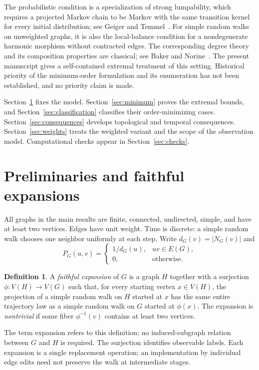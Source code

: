 \documentclass[11pt]{article}
\theoremstyle{definition}
\newtheorem{definition}[theorem]{Definition}
\numberwithin{equation}{section}
\newcommand{\V}{V}
\newcommand{\E}{E}
\newcommand{\N}{N}
\begin{document}
The probabilistic condition is a specialization of strong lumpability,
which requires a projected Markov chain to be Markov with the same transition
kernel for every initial distribution; see Geiger and Temmel~\cite{GT}.
For simple random walks on unweighted graphs, it is also the local-balance
condition for a nondegenerate harmonic morphism without contracted edges.
The corresponding degree theory and its composition properties are
classical; see Baker and Norine~\cite{BN}. The present manuscript gives a
self-contained extremal treatment of this setting. Historical priority of
the minimum-order formulation and its enumeration has not been established,
and no priority claim is made.

Section~\ref{sec:prelim} fixes the model.
Section~\ref{sec:minimum} proves the extremal bounds, and
Section~\ref{sec:classification} classifies their order-minimizing cases.
Section~\ref{sec:consequences} develops topological and temporal consequences.
Section~\ref{sec:weights} treats the weighted variant and the scope of the
observation model. Computational checks appear in Section~\ref{sec:checks}.

\section{Preliminaries and faithful expansions}\label{sec:prelim}

All graphs in the main results are finite, connected, undirected, simple,
and have at least two vertices. Edges have unit weight. Time is discrete:
a simple random walk chooses one neighbor uniformly at each step.
Write $d_G(v)=|\N_G(v)|$ and
\[
 P_G(u,v)=\begin{cases}1/d_G(u),&uv\in\E(G),\\0,&\text{otherwise.}\end{cases}
\]

\begin{definition}
A \emph{faithful expansion} of $G$ is a graph $H$ together with a surjection
$\phi:\V(H)\to\V(G)$ such that, for every starting vertex $x\in\V(H)$,
the projection of a simple random walk on $H$ started at $x$ has the same
entire trajectory law as a simple random walk on $G$ started at $\phi(x)$.
The expansion is \emph{nontrivial} if some fiber $\phi^{-1}(v)$ contains
at least two vertices.
\end{definition}

The term expansion refers to this definition; no induced-subgraph relation
between $G$ and $H$ is required. The surjection identifies observable labels.
Each expansion is a single replacement operation; an implementation by
individual edge edits need not preserve the walk at intermediate stages.
\end{document}
